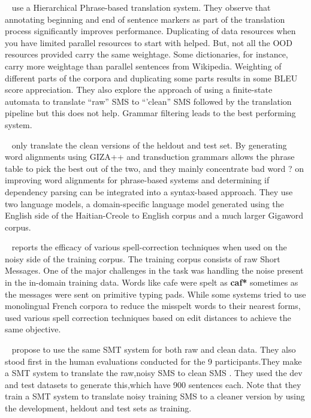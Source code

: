  ~\cite{Vladimir:11} use a Hierarchical Phrase-based translation system. They observe that annotating beginning and end of sentence markers as part of the translation process significantly improves performance. Duplicating of data resources when you have limited parallel resources to start with helped. But, not all the OOD resources provided carry the same weightage. Some dictionaries, for instance, carry more weightage than parallel sentences from Wikipedia. Weighting of different parts of the corpora and duplicating some parts results in some BLEU score appreciation. They also explore the approach of using a finite-state automata to translate ``raw'' SMS to ``'clean'' SMS followed by the  translation pipeline but this does not help. Grammar filtering leads to the best performing system. 


 ~\cite{Hardmeier:11} only translate the clean versions of the heldout and test set. By generating word alignments using GIZA++ and transduction grammars allows the phrase table to pick the best out of the two, and they mainly concentrate \alert{bad word ?} on improving word alignments for phrase-based systems and determining if dependency parsing can be integrated into a syntax-based approach. They use two language models, a domain-specific language model generated using the English side of the Haitian-Creole to English corpus and a much larger Gigaword corpus. 



 ~\cite{Sara:11} reports the efficacy of various spell-correction techniques when used on the noisy side of the training corpus. The training corpus consists of raw Short Messages. One of the major challenges in the task was handling the noise present in the in-domain training data. Words like cafe were spelt as \textbf{caf*} sometimes as the messages were sent on  primitive typing pads. While some systems tried to use monolingual French corpora to reduce the misspelt words to their nearest forms,~\cite{Sara:11} used various spell correction techniques based on edit distances to achieve the same objective. 


 ~\cite{Banchs:11} propose to use the same SMT system for both raw and clean data.  They also stood first in the human evaluations conducted for the 9 participants.They make a SMT system to translate the raw,noisy SMS to clean SMS . They used the dev and test datasets to generate this,which have 900 sentences each. Note that they train a SMT system to translate noisy training SMS to a cleaner version by using the development, heldout and test sets as training. 







